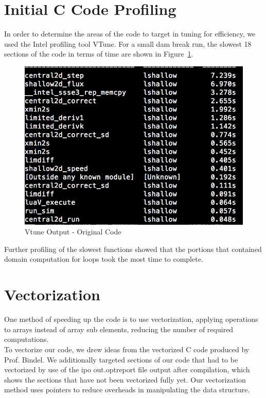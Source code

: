 \documentclass{article}
\begin{document}
\clearpage
\section{Initial C Code Profiling}

In order to determine the areas of the code to target in tuning for efficiency, we used the Intel profiling tool VTune. For a small dam break run, the slowest 18 sections of the code in terms of time are shown in Figure~\ref{v_orig}. 
 
\begin{figure}[here]
 \centering
 \includegraphics[width=0.4\linewidth]{VTUNE_OrigC.png}
 \caption{Vtune Output - Original Code}
 \label{v_orig}
\end{figure}

Further profiling of the slowest functions showed that the portions that contained domain computation for loops took the most time to complete. 

\section{Vectorization}
One method of speeding up the code is to use vectorization, applying operations to arrays instead of array sub elements, reducing the number of required computations. \\

To vectorize our code, we drew ideas from the vectorized C code produced by Prof. Bindel. We additionally targeted sections of our code that had to be vectorized by use of the ipo out.optreport file output after compilation, which shows the sections that have not been vectorized fully yet. Our vectorization method uses pointers to reduce overheads in manipulating the data structure. 
\end{document}
